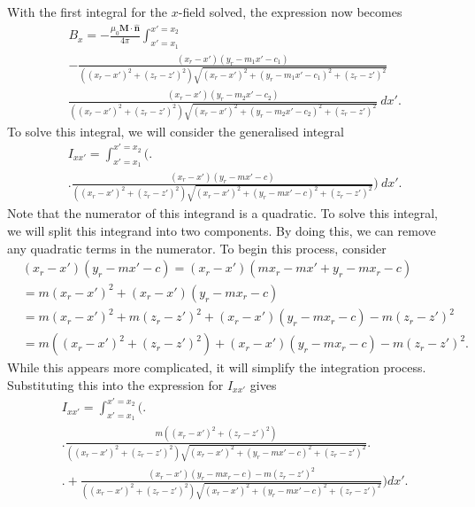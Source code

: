 With the first integral for the \(x\)-field solved, the expression now becomes
\begin{align}
    &B_x = -\frac{\mu_0\mathbf{M}\cdot\hat{\mathbf{n}}}{4\pi} \int_{x'=x_1}^{x'=x_2} \nonumber \\
    & - \frac{\left(x_r-x'\right)\left(y_r-m_1x'-c_1\right)}{\left(\left(x_r-x'\right)^2+\left(z_r-z'\right)^2\right)\sqrt{\left(x_r-x'\right)^2+\left(y_r-m_1x'-c_1\right)^2+\left(z_r-z'\right)^2}} \nonumber \\
    & \frac{\left(x_r-x'\right)\left(y_r-m_2x'-c_2\right)}{\left(\left(x_r-x'\right)^2+\left(z_r-z'\right)^2\right)\sqrt{\left(x_r-x'\right)^2+\left(y_r-m_2x'-c_2\right)^2+\left(z_r-z'\right)^2}}\ dx' \text{.}
\end{align}
To solve this integral, we will consider the generalised integral
\begin{align}
    &I_{xx'} = \int_{x'=x_1}^{x'=x_2} \Bigg( \Bigg. \nonumber \\ 
    &\Bigg. \frac{\left(x_r-x'\right)\left(y_r-mx'-c\right)}{\left(\left(x_r-x'\right)^2+\left(z_r-z'\right)^2\right)\sqrt{\left(x_r-x'\right)^2+\left(y_r-mx'-c\right)^2+\left(z_r-z'\right)^2}} \Bigg) \ dx' \text{.}
\end{align}
Note that the numerator of this integrand is a quadratic. To solve this integral, we will split this integrand into two components. By doing this, we can remove any quadratic terms in the numerator. To begin this process, consider
\begin{align}
    &\left(x_r-x'\right)\left(y_r-mx'-c\right) = \left(x_r-x'\right)\left(mx_r-mx'+y_r-mx_r-c\right) \nonumber \\
    &= m\left(x_r-x'\right)^2 + \left(x_r-x'\right)\left(y_r-mx_r-c\right) \nonumber \\
    &= m\left(x_r-x'\right)^2 + m\left(z_r-z'\right)^2 + \left(x_r-x'\right)\left(y_r-mx_r-c\right) - m\left(z_r-z'\right)^2 \nonumber \\
    &= m\left(\left(x_r-x'\right)^2 + \left(z_r-z'\right)^2\right) + \left(x_r-x'\right)\left(y_r-mx_r-c\right) - m\left(z_r-z'\right)^2 \nonumber \text{.}
\end{align}
While this appears more complicated, it will simplify the integration process. Substituting this into the expression for \(I_{xx'}\) gives
\begin{align}
    &I_{xx'} = \int_{x'=x_1}^{x'=x_2} \Bigg( \Bigg. \nonumber \\
    & \Bigg. \frac{m\left(\left(x_r-x'\right)^2+\left(z_r-z'\right)^2\right)}{\left(\left(x_r-x'\right)^2+\left(z_r-z'\right)^2\right)\sqrt{\left(x_r-x'\right)^2+\left(y_r-mx'-c\right)^2+\left(z_r-z'\right)^2}} \Bigg. \nonumber \\
    & \Bigg. + \frac{\left(x_r-x'\right)\left(y_r-mx_r-c\right) - m\left(z_r-z'\right)^2}{\left(\left(x_r-x'\right)^2+\left(z_r-z'\right)^2\right)\sqrt{\left(x_r-x'\right)^2+\left(y_r-mx'-c\right)^2+\left(z_r-z'\right)^2}} \Bigg) dx' \text{.}
\end{align}
